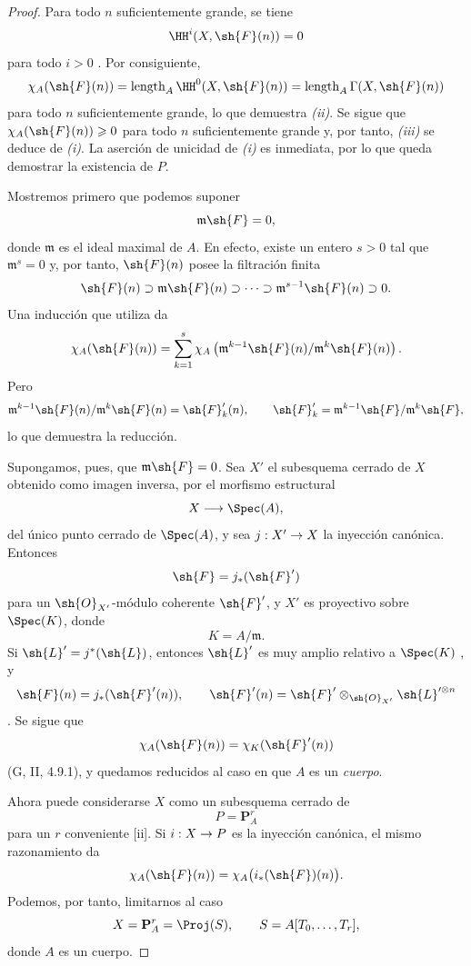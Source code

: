 \documentclass[oneside]{amsart}
\makeatletter
\renewcommand{\geq}{\geqslant}
\newcommand{\ega@arrow}[2]{\mathchoice{#1}{#2}{#2}{#2}}
\renewcommand{\to}{\ega@arrow{\longrightarrow}{\rightarrow}}
\newcommand{\oldpage}[2][]{{\marginnote{\normalfont\textbf{#1}~|~#2}}\ignorespaces}
\makeatother
\begin{document}
\begin{proof}
Para todo $n$ suficientemente grande, se tiene
\[
  \HH^i(X,\sh{F}(n))=0
\]
para todo $i>0$ .
\oldpage[III]{110}
Por consiguiente,
\[
  \chi_A(\sh{F}(n))
  =
  \operatorname{length}_A\HH^0(X,\sh{F}(n))
  =
  \operatorname{length}_A\Gamma(X,\sh{F}(n))
\]
para todo $n$ suficientemente grande, lo que demuestra \emph{(ii)}.
Se sigue que $\chi_A(\sh{F}(n))\geq0$ para todo $n$ suficientemente grande y, por tanto, \emph{(iii)} se deduce de \emph{(i)}.
La aserción de unicidad de \emph{(i)} es inmediata, por lo que queda demostrar la existencia de $P$.

Mostremos primero que podemos suponer
\[
  \mathfrak{m}\sh{F}=0,
\]
donde $\mathfrak{m}$ es el ideal maximal de $A$.
En efecto, existe un entero $s>0$ tal que $\mathfrak{m}^s=0$ y, por tanto, $\sh{F}(n)$ posee la filtración finita
\[
  \sh{F}(n)
  \supset\mathfrak{m}\sh{F}(n)
  \supset\cdots
  \supset\mathfrak{m}^{s-1}\sh{F}(n)
  \supset0.
\]
Una inducción que utiliza  da
\[
  \chi_A(\sh{F}(n))
  =
  \sum_{k=1}^{s}
  \chi_A\left(
    \mathfrak{m}^{k-1}\sh{F}(n)/
    \mathfrak{m}^{k}\sh{F}(n)
  \right).
\]
Pero
\[
  \mathfrak{m}^{k-1}\sh{F}(n)/
  \mathfrak{m}^{k}\sh{F}(n)
  =
  \sh{F}'_k(n),
  \qquad
  \sh{F}'_k=
  \mathfrak{m}^{k-1}\sh{F}/\mathfrak{m}^{k}\sh{F},
\]
lo que demuestra la reducción.

Supongamos, pues, que $\mathfrak{m}\sh{F}=0$.
Sea $X'$ el subesquema cerrado de $X$ obtenido como imagen inversa, por el morfismo estructural
\[
  X\longrightarrow\Spec(A),
\]
del único punto cerrado de $\Spec(A)$, y sea $j:X'\to X$ la inyección canónica.
Entonces
\[
  \sh{F}=j_*(\sh{F}')
\]
para un $\sh{O}_{X'}$-módulo coherente $\sh{F}'$, y $X'$ es proyectivo sobre $\Spec(K)$, donde
\[
  K=A/\mathfrak{m}.
\]
Si $\sh{L}'=j^*(\sh{L})$, entonces $\sh{L}'$ es muy amplio relativo a $\Spec(K)$ , y
\[
  \sh{F}(n)=j_*(\sh{F}'(n)),
  \qquad
  \sh{F}'(n)
  =
  \sh{F}'\otimes_{\sh{O}_{X'}}\sh{L}'^{\otimes n}
\]
.
Se sigue que
\[
  \chi_A(\sh{F}(n))
  =
  \chi_K(\sh{F}'(n))
\]
(G, II, 4.9.1), y quedamos reducidos al caso en que $A$ es un \emph{cuerpo}.

Ahora puede considerarse $X$ como un subesquema cerrado de
\[
  P=\mathbf{P}_A^r
\]
para un $r$ conveniente [ii].
Si $i:X\to P$ es la inyección canónica, el mismo razonamiento da
\[
  \chi_A(\sh{F}(n))
  =
  \chi_A\bigl(i_*(\sh{F})(n)\bigr).
\]
Podemos, por tanto, limitarnos al caso
\[
  X=\mathbf{P}_A^r=\Proj(S),
  \qquad
  S=A[T_0,\ldots,T_r],
\]
donde $A$ es un cuerpo.


\end{proof}
\end{document}
